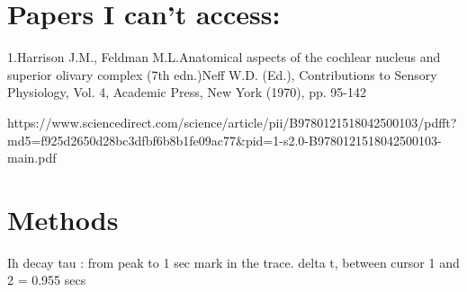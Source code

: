 \documentclass{article}
\begin{document}
\section{Papers I can't access:}

1.Harrison J.M., Feldman M.L.Anatomical aspects of the cochlear nucleus and superior olivary complex
(7th edn.)Neff W.D. (Ed.), Contributions to Sensory Physiology, Vol. 4, Academic Press, New York (1970), pp. 95-142

https://www.sciencedirect.com/science/article/pii/B9780121518042500103/pdfft?md5=f925d2650d28bc3dfbf6b8b1fe09ac77\&pid=1-s2.0-B9780121518042500103-main.pdf




\section{Methods}

Ih decay tau : from peak to 1 sec mark in the trace. delta t, between cursor 1 and 2 = 0.955 secs
\end{document}

